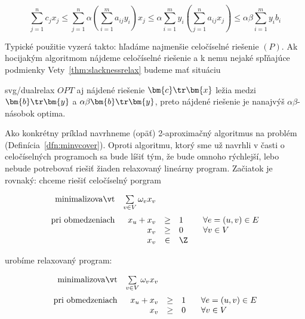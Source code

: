 \begin{dokaz}
  $$\sum_{j=1}^nc_jx_j\le\sum_{j=1}^n\alpha\left(\sum_{i=1}^ma_{ij}y_i\right)x_j
  \le\alpha\sum_{i=1}^my_i\left(\sum_{j=1}^na_{ij}x_j\right)\le\alpha\beta\sum_{i=1}^my_ib_i
  $$
\end{dokaz}

\noindent
Typické použitie vyzerá takto: hľadáme najmenšie celočíselné riešenie $(P)$. Ak hocijakým algoritmom nájdeme
celočíselné riešenie  a k nemu nejaké  spľňajúce podmienky Vety~\ref{thm:slacknessrelax} budeme
mať situáciu

\begin{myfig}{\textwidth}{svg/dualrelax}
  $OPT$ aj nájdené riešenie $\bm{c}\tr\bm{x}$ ležia medzi $\bm{b}\tr\bm{y}$ a $\alpha\beta\bm{b}\tr\bm{y}$,
  preto nájdené riešenie je nanajvýš $\alpha\beta$-násobok optima.
\end{myfig}

\noindent
Ako konkrétny príklad navrhneme (opäť) 2-aproximačný algoritmus na problém \minvcover 
(Definícia~\ref{dfn:minvcover}). Oproti algoritmu, ktorý sme už navrhli v časti o celočíselných programoch
sa bude líšiť tým, že bude omnoho rýchlejší, lebo nebude potrebovať riešiť žiaden relaxovaný 
lineárny program. Začiatok je rovnaký: chceme riešiť celočíselný porgram

\edef\tmp{\theequation}

\addtocounter{equation}{-1}


\begin{equation}
\begin{array}{rrcll}
  {\rm minimalizovať}     & \multicolumn{1}{l}{\sum\limits_{v\in V}\omega_vx_v}\\[3ex]
  {\rm pri\ obmedzeniach} & x_u + x_v&\ge&1& \;\;\;\forall e=(u,v)\in E\\
                          & x_v&\ge&0& \;\;\;\forall v\in V\\
                          & x_v&\in&\Z
\end{array}
\end{equation}

\noindent
urobíme relaxovaný program:

\begin{equation}
\begin{array}{rrcll}
  {\rm minimalizovať}     & \multicolumn{1}{l}{\sum\limits_{v\in V}\omega_vx_v}\\[3ex]
  {\rm pri\ obmedzeniach} & x_u + x_v&\ge&1& \;\;\;\forall e=(u,v)\in E\\
                          & x_v&\ge&0& \;\;\;\forall v\in V\\
\end{array}
\end{equation}

